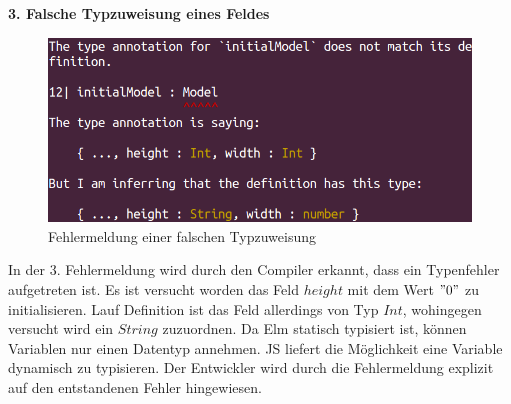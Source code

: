 \textbf{3. Falsche Typzuweisung eines Feldes}\\
\begin{figure}[h!]
\centering
\includegraphics[scale=0.5]{img/types-error.png}
\caption{Fehlermeldung einer falschen Typzuweisung}
\end{figure}
In der 3. Fehlermeldung wird durch den Compiler erkannt, dass ein Typenfehler aufgetreten ist. Es ist versucht worden das Feld $height$ mit dem Wert $"0"$ zu initialisieren. Lauf Definition ist das Feld allerdings von Typ $Int$, wohingegen versucht wird ein $String$ zuzuordnen. Da Elm statisch typisiert ist, können Variablen nur einen Datentyp annehmen. \ac{JS} liefert die Möglichkeit eine Variable dynamisch zu typisieren. Der Entwickler wird durch die Fehlermeldung explizit auf den entstandenen Fehler hingewiesen.
\\

